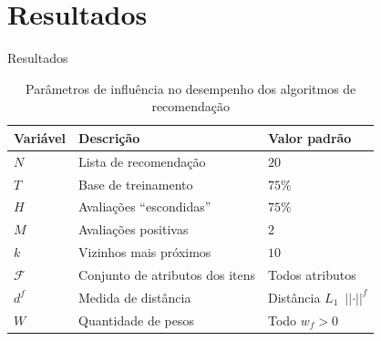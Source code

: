 \section[Resultados]{Resultados}

\begin{frame}{Resultados}
\begin{table}[hp]
\begin{center}
    \caption{Parâmetros de influência no desempenho dos algoritmos de recomendação}\vspace{-.5cm}
    \label{tab:variaveis}
    \begin{tabular}{  | p{1.5cm} | p{5.5cm} | p{3.0cm} | } 
    \hline
    \textbf{Variável} & \textbf{Descrição} & \textbf{Valor padrão}  \\ \hline
    $N$ & Lista de recomendação & $20$ \\ \hline   
    $T$ & Base de treinamento & $75\%$ \\ \hline
    $H$ & Avaliações ``escondidas'' & $75\%$ \\ \hline
    $M$ & Avaliações positivas & $2$ \\ \hline
    $k$ & Vizinhos mais próximos & $10$ \\ \hline
    $\mathcal{F}$ & Conjunto de atributos dos itens & Todos atributos \\ \hline
    $d^f$ & Medida de distância & Distância $L_1$~$\left|\left|\cdot\right|\right|^f$ \\ \hline
    $W$ & Quantidade de pesos & Todo $w_f>0$ \\ \hline
    \end{tabular}
\end{center}
\end{table}
\end{frame}

